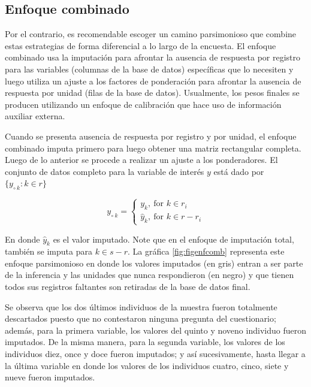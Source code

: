 \documentclass[
  12pt,
]{book}
\begin{document}
\hypertarget{enfoque-combinado}{%
\subsection{Enfoque combinado}\label{enfoque-combinado}}

Por el contrario, es recomendable escoger un camino parsimonioso que combine estas estrategias de forma diferencial a lo largo de la encuesta. El enfoque combinado usa la imputación para afrontar la ausencia de respuesta por registro para las variables (columnas de la base de datos) específicas que lo necesiten y luego utiliza un ajuste a los factores de ponderación para afrontar la ausencia de respuesta por unidad (filas de la base de datos). Usualmente, los pesos finales se producen utilizando un enfoque de calibración que hace uso de información auxiliar externa.

Cuando se presenta ausencia de respuesta por registro y por unidad, el enfoque combinado imputa primero para luego obtener una matriz rectangular completa. Luego de lo anterior se procede a realizar un ajuste a los ponderadores. El conjunto de datos completo para la variable de interés \(y\) está dado por \(\{y_{\circ \  k}: k\in r\}\)

\[
y_{\circ \  k} = 
\begin{cases}
y_k, \ \text{for $k \in r_i$} \\
\hat{y}_k, \ \text{for $k \in r - r_i$}
\end{cases}
\]

En donde \(\hat{y}_k\) es el valor imputado. Note que en el enfoque de imputación total, también se imputa para \(k \in s-r\). La gráfica \ref{fig:figenfcomb} representa este enfoque parsimonioso en donde los valores imputados (en gris) entran a ser parte de la inferencia y las unidades que nunca respondieron (en negro) y que tienen todos sus registros faltantes son retiradas de la base de datos final.

Se observa que los dos últimos individuos de la muestra fueron totalmente descartados puesto que no contestaron ninguna pregunta del cuestionario; además, para la primera variable, los valores del quinto y noveno individuo fueron imputados. De la misma manera, para la segunda variable, los valores de los individuos diez, once y doce fueron imputados; y así sucesivamente, hasta llegar a la última variable en donde los valores de los individuos cuatro, cinco, siete y nueve fueron imputados.
\end{document}
